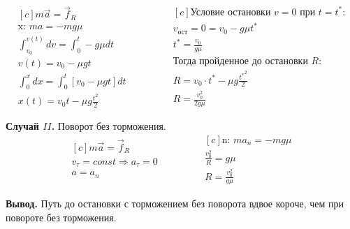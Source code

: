 \documentclass[a5paper,10pt]{article}\usepackage[usenames,dvipsnames]{color}\usepackage{extsizes,cmap,graphicx,misccorr,indentfirst,makecell,multirow,ulem,geometry,amssymb,amsfonts,amsmath,amsthm,titlesec,float,fancyhdr,wrapfig,tikz}\usepackage[T2A]{fontenc}\usepackage[utf8x]{inputenc}\usepackage[english, russian]{babel}\usetikzlibrary{decorations.pathreplacing,decorations.pathmorphing,patterns,calc,scopes,arrows,through,positioning,shapes.misc}\graphicspath{{img/}}\linespread{1.3}\frenchspacing\geometry{left=1cm, right=1cm, top=2cm, bottom=1cm, bindingoffset=0cm}\pagestyle{fancy}\fancyhead{}\fancyhead[R]{Сарафанов Ф.Г.}
\begin{document}
\begin{equation*}
    \begin{aligned}[c]
		m\vec{a}=\vec{f}_R\\
		\text{x: }ma=-mg\mu\\
		\int_{v_0}^{v(t)}dv=\int_0^t -g\mu dt\\
		v(t)=v_0-\mu{gt}\\
		\int_{0}^{x}dx=\int_0^t [v_0-\mu{gt}] dt\\
		x(t)=v_0{t}-\mu{g}\frac{t^2}{2}
    \end{aligned}
        \qquad\qquad
    \begin{aligned}[c]
    \text{Условие остановки $v=0$ при $t=t^*$:}\\
    v_\text{ост}=0=v_0-g\mu{}t^*\\
    t^*=\frac{v_0}{g\mu}\\
    \text{Тогда пройденное до остановки $R$:}\\
    R=v_0\cdot{t^*}-\mu{g}\frac{{t^*}^2}{2}\\
    R=\frac{v_0^2}{2g\mu}
    \end{aligned}
\end{equation*}

\textbf{Случай $II$.} Поворот без торможения.
\begin{equation*}
    \begin{aligned}[c]
	m\vec{a}=\vec{f}_R\\
	v_\tau=const \Longrightarrow a_\tau=0 \\ a=a_n\\
    \end{aligned}
        \qquad\qquad
    \begin{aligned}[c]
	\text{n: } ma_n=-mg\mu\\
	\frac{v_0^2}{R}=g\mu\\
	R=\frac{v_0^2}{g\mu}
    \end{aligned}
\end{equation*}

\textbf{Вывод.} Путь до остановки с торможением без поворота  вдвое короче, чем при повороте без торможения.
\end{document}
